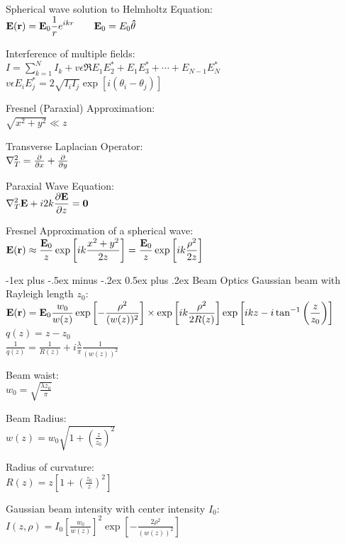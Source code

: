 \documentclass[12pt,landscape]{article}
\makeatletter
\renewcommand{\section}{\@startsection{section}{1}{0mm}%
                                {-1ex plus -.5ex minus -.2ex}%
                                {0.5ex plus .2ex}%
                                {\normalfont\normalsize\bfseries}}
\newcommand{\tab}{\hspace{.02\textwidth}}
\newcommand{\ds}{\displaystyle}
\makeatother
\begin{document}
\begin{multicols}{3}
Spherical wave solution to Helmholtz Equation:\\
\tab $\ds \vb{E}(\vb{r}) = \vb{E}_0 \frac{1}{r}e^{ikr} \qquad \vb{E}_0 = E_0\vu{\theta}$

Interference of multiple fields:\\
\tab $I = \sum_{k=1}^{N}I_k + v\epsilon \Re{E_1 E_2^* + E_1 E_3^* + \cdots + E_{N-1} E_N^*}$\\
\tab $v\epsilon E_i E_j^* = 2\sqrt{I_i I_j}\exp[i(\theta_i - \theta_j)]$

Fresnel (Paraxial) Approximation:\\
\tab $\sqrt{x^2 + y^2} \ll z$

Transverse Laplacian Operator:\\
\tab $\laplacian_T = \pdv{x} + \pdv{y}$

Paraxial Wave Equation:\\
\tab $\ds \laplacian_T \vb{E} + i2k\pdv{\vb{E}}{z} = \vb{0}$

Fresnel Approximation of a spherical wave:\\
\tab $\ds \vb{E}(\vb{r}) \approx \frac{\vb{E}_0}{z}\exp\left[ik \frac{x^2 + y^2}{2z}\right] = \frac{\vb{E}_0}{z}\exp\left[ik\frac{\rho^2}{2z}\right]$

\section{Beam Optics}
Gaussian beam with Rayleigh length $z_0$:\\
\tab $\ds \vb{E}(\vb{r}) = \vb{E}_0 \frac{w_0}{w(z)}\exp\left[-\frac{\rho^2}{(w(z))^2}\right]\times\exp\left[ik\frac{\rho^2}{2R(z)}\right]\exp\left[ikz - i\tan^{-1}\left(\frac{z}{z_0}\right)\right]$\\
\tab $q(z) = z - z_0$\\
\tab $\ds \frac{1}{q(z)} = \frac{1}{R(z)} + i\frac{\lambda}{\pi}\frac{1}{(w(z))^2}$

Beam waist:\\
\tab $\ds w_0 = \sqrt{\frac{\lambda z_0}{\pi}}$

Beam Radius:\\
\tab $\ds w(z) = w_0\sqrt{1 + \left(\frac{z}{z_0}\right)^2}$

Radius of curvature:\\
\tab $\ds R(z) = z\left[1 + \left(\frac{z_0}{z}\right)^2\right]$

Gaussian beam intensity with center intensity $I_0$:\\
\tab $\ds I(z, \rho) = I_0\left[\frac{w_0}{w(z)}\right]^2\exp\left[-\frac{2\rho^2}{(w(z))^2}\right]$


\end{multicols}
\end{document}
